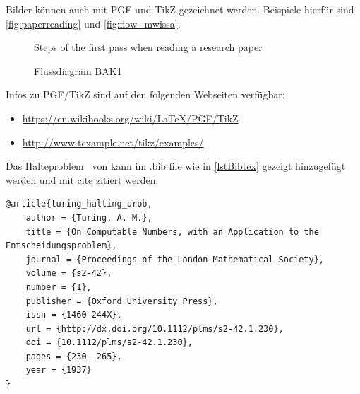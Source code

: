 Bilder können auch mit PGF und TikZ gezeichnet werden.
Beispiele hierfür sind \autoref{fig:paperreading} und \autoref{fig:flow_mwissa}.

\begin{figure}[ht]
    \centering
    
    \caption{Steps of the first pass when reading a research paper}
    \label{fig:paperreading}
\end{figure}


\begin{figure}[ht]
    \centering
    
    \caption{Flussdiagram BAK1}
    \label{fig:flow_mwissa}
\end{figure}

Infos zu PGF/TikZ sind auf den folgenden Webseiten verfügbar:
\begin{itemize}
    \item \url{https://en.wikibooks.org/wiki/LaTeX/PGF/TikZ}
    \item \url{http://www.texample.net/tikz/examples/}
\end{itemize}




Das Halteproblem~\cite{turing_halting_prob} von \citeauthor{turing_halting_prob} kann im .bib file wie in \autoref{lstBibtex} gezeigt hinzugefügt werden und mit cite zitiert werden.



\begin{lstlisting}[style=bibtexListing,label=lstBibtex,caption={BibTeX}]
@article{turing_halting_prob,
    author = {Turing, A. M.},
    title = {On Computable Numbers, with an Application to the Entscheidungsproblem},
    journal = {Proceedings of the London Mathematical Society},
    volume = {s2-42},
    number = {1},
    publisher = {Oxford University Press},
    issn = {1460-244X},
    url = {http://dx.doi.org/10.1112/plms/s2-42.1.230},
    doi = {10.1112/plms/s2-42.1.230},
    pages = {230--265},
    year = {1937}
}
\end{lstlisting}
